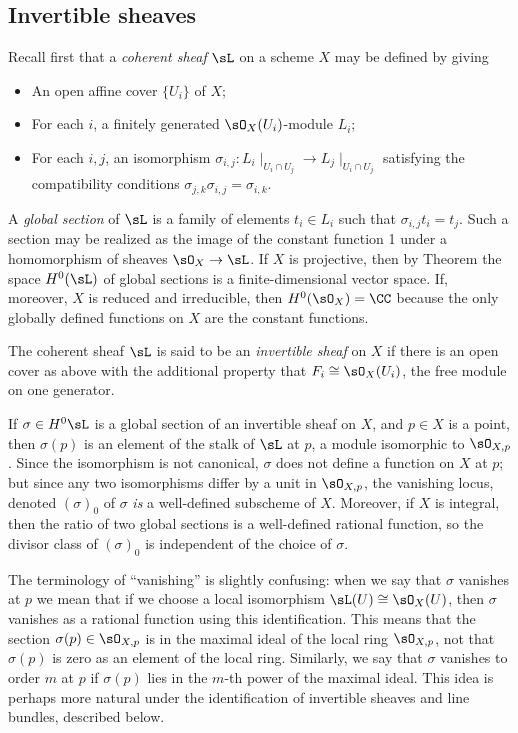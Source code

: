 \subsection{Invertible sheaves}\label{Invertible sheaves}
Recall first that a \emph{coherent sheaf} $\sL$ on a scheme $X$ may be defined by
giving 
\begin{itemize}
 \item An open affine cover $\{U_{i}\}$ of $X$; 
 \item For each $i$, a finitely generated $\sO_{X}(U_{i})$-module $L_{i}$;
 \item For each $i,j$, an isomorphism $\sigma_{i,j}: L_{i}\mid_{U_{i}\cap U_{j}} \to L_{j}\mid_{U_{i}\cap U_{j}}$
 satisfying the compatibility conditions $\sigma_{j,k}\sigma_{i,j} = \sigma_{i,k}$. 
 \end{itemize}

A \emph{global section} of $\sL$ is a family of elements $t_{i}\in L_{i}$ such that 
$\sigma_{i,j} t_{i} = t_{j}$. Such a section may be realized as the image of the constant function 1 under
a homomorphism of sheaves $\sO_{X} \to \sL$. If $X$ is projective, then 
by Theorem \cite[Thm III.5.2]{H} the space $H^{0}(\sL)$  of global sections is
a finite-dimensional vector space. If, moreover, $X$ is reduced and irreducible, then $H^{0}(\sO_{X}) = \CC$ because the only globally defined
functions on $X$ are the constant functions.

The coherent sheaf $\sL$ is said to be an \emph{invertible sheaf} on $X$ if there is an open cover as above with the additional property
that $F_{i} \cong \sO_X(U_{i})$, the free module on one generator. 

If $\sigma \in H^0\sL$ is a global section of an invertible sheaf
on $X$, and $p\in X$ is a point, then $\sigma(p)$ is an element of the stalk of $\sL$ at $p$, a module isomorphic to $\sO_{X,p}$. Since the isomorphism is not canonical, $\sigma$ does not define a function on $X$ at $p$; but since any two isomorphisms
differ by a unit in $\sO_{X,p}$, the vanishing locus, denoted $(\sigma)_0$ of $\sigma$ \emph{is} a well-defined subscheme of $X$. Moreover, if $X$ is integral, then the ratio of two global sections is a well-defined rational function, so the divisor class of 
$(\sigma)_0$ is independent of the choice of $\sigma$.

The terminology of ``vanishing'' is slightly confusing: when we  say that $\sigma$ vanishes at $p$ we mean
that if we choose a local isomorphism $\sL(U) \cong \sO_X(U)$, then $\sigma$ vanishes as a rational function using this
identification. This means that the section $\sigma(p)\in \sO_{X,p}$ is in the maximal ideal of the local ring $ \sO_{X,p}$, not that $\sigma(p)$ is zero
as an element of the local ring. Similarly, we say that $\sigma$ vanishes to order $m$ at $p$ if $\sigma(p)$ lies in the
$m$-th power of the maximal ideal. This idea is perhaps more natural under the identification of invertible sheaves and line bundles, described below.

